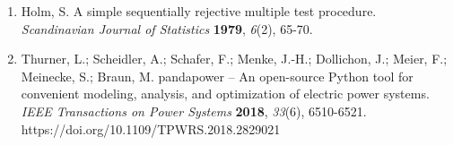 \documentclass[
  10pt,
  a4paper,
]{article}
\begin{document}
\begin{enumerate}
  Blank, J.; Deb, K. pymoo: Multi-objective optimization in Python.
  \emph{IEEE Access} \textbf{2020}, \emph{8}, 89497-89509.
  https://doi.org/10.1109/ACCESS.2020.2990567
\item
  Holm, S. A simple sequentially rejective multiple test procedure.
  \emph{Scandinavian Journal of Statistics} \textbf{1979}, \emph{6}(2),
  65-70.
\item
  Thurner, L.; Scheidler, A.; Schafer, F.; Menke, J.-H.; Dollichon, J.;
  Meier, F.; Meinecke, S.; Braun, M. pandapower -- An open-source Python
  tool for convenient modeling, analysis, and optimization of electric
  power systems. \emph{IEEE Transactions on Power Systems}
  \textbf{2018}, \emph{33}(6), 6510-6521.
  https://doi.org/10.1109/TPWRS.2018.2829021
\end{enumerate}
\end{document}
